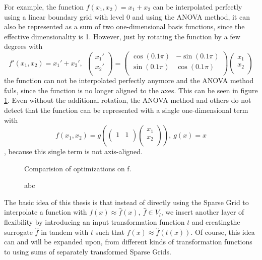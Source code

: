 \documentclass[
  a4paper,  %
  twoside,  %
  bibliography=totoc,
  headsepline,
  cleardoublepage=empty,
  parskip=half,
  draft=false
]{scrbook}
\begin{document}
For example, the function $f(x_1,x_2)=x_1 + x_2$ can be interpolated perfectly using a linear boundary grid with level 0 and using the ANOVA method, it can also be represented as a sum of two one-dimensional basis functions, since the effective dimensionality is 1.
However, just by rotating the function by a few degrees with
\begin{equation}
f'(x_1,x_2)=x_1' + x_2', ~~ \begin{pmatrix}
    x_1' \\ x_2'
    \\
  \end{pmatrix} = \begin{pmatrix}
    \cos(0.1 \pi) & -\sin(0.1 \pi)\\
    \sin(0.1 \pi) & \cos(0.1 \pi)
    \\
  \end{pmatrix}\begin{pmatrix}
    x_1 \\ x_2
    \\
  \end{pmatrix}
\end{equation}
the function can not be interpolated perfectly anymore and the ANOVA method fails, since the function is no longer aligned to the axes.
This can be seen in figure \ref{fig:fcomp}.
Even without the additional rotation, the ANOVA method and others do not detect that the function can be represented with a single one-dimensional term with
\begin{equation}
f(x_1,x_2)=g(\begin{pmatrix}
    1 & 1
    \\
  \end{pmatrix} \begin{pmatrix}
    x_1 \\ x_2
    \\
  \end{pmatrix}), ~ g(x)=x
\end{equation}
, because this single term is not axis-aligned.

\begin{figure}[H]
Comparision of optimizations on f.
\label{fig:fcomp}
\caption{abc}
\end{figure}

The basic idea of this thesis is that instead of directly using the Sparse Grid to interpolate a function with $f(x) \approx \hat{f}(x), ~ \hat{f} \in V_l$, we insert another layer of flexibility by introducing an input transformation function $t$ and creatingthe surrogate $\hat{f}$ in tandem with $t$ such that $f(x) \approx \hat{f}(t(x))$.
Of course, this idea can and will be expanded upon, from different kinds of transformation functions to using sums of separately transformed Sparse Grids.
\end{document}
